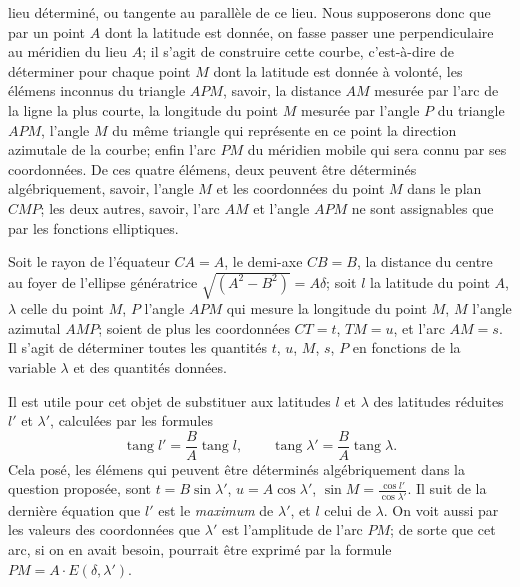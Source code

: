 \documentclass{article}
\begin{document}
lieu déterminé, ou tangente au parallèle de ce lieu. Nous supposerons donc que par un point $A$ dont la latitude est donnée, on fasse passer une perpendiculaire au méridien du lieu $A$; il s'agit de construire cette courbe, c'est-à-dire de déterminer pour chaque point $M$ dont la latitude est donnée à volonté, les élémens inconnus du triangle $APM$, savoir, la distance $AM$ mesurée par l'arc de la ligne la plus courte, la longitude du point $M$ mesurée par l'angle $P$ du triangle $APM$, l'angle $M$ du même triangle qui représente en ce point la direction azimutale de la courbe; enfin l'arc $PM$ du méridien mobile qui sera connu par ses coordonnées. De ces quatre élémens, deux peuvent être déterminés algébriquement, savoir, l'angle $M$ et les coordonnées du point $M$ dans le plan $CMP$; les deux autres, savoir, l'arc $AM$ et l'angle $APM$ ne sont assignables que par les fonctions elliptiques.


Soit le rayon de l'équateur $CA=A$, le demi-axe $CB=B$, la distance du centre au foyer de l'ellipse génératrice $\sqrt{(A^{2}-B^{2})}=A\delta$; soit $l$ la latitude du point $A$, $\lambda$ celle du point $M$, $P$ l'angle $APM$ qui mesure la longitude du point $M$, $M$ l'angle azimutal $AMP$; soient de plus les coordonnées $CT=t$, $TM=u$, et l'arc $AM=s$. Il s'agit de déterminer toutes les quantités $t$, $u$, $M$, $s$, $P$ en fonctions de la variable $\lambda$ et des quantités données.

Il est utile pour cet objet de substituer aux latitudes $l$ et $\lambda$ des latitudes réduites $l'$ et $\lambda'$, calculées par les formules
\[ \operatorname{tang} l'=\frac{B}{A}\operatorname{tang} l,\qquad \operatorname{tang}\lambda'=\frac{B}{A}\operatorname{tang}\lambda. \]
Cela posé, les élémens qui peuvent être déterminés algébriquement dans la question proposée, sont $t=B\sin\lambda'$, $u=A\cos\lambda'$, $\sin M=\frac{\cos l'}{\cos\lambda'}$. Il suit de la dernière équation que $l'$ est le \emph{maximum} de $\lambda'$, et $l$ celui de $\lambda$. On voit aussi par les valeurs des coordonnées que $\lambda'$ est l'amplitude de l'arc $PM$; de sorte que cet arc, si on en avait besoin, pourrait être exprimé par la formule $PM=A\cdot E(\delta,\lambda')$.
\end{document}
